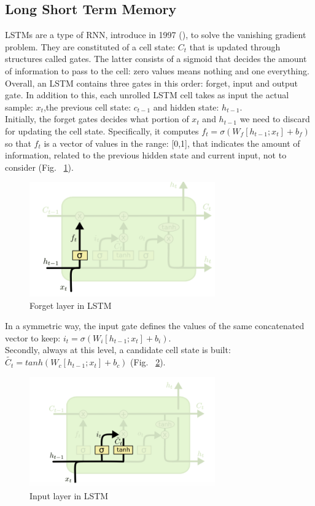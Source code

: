 \documentclass[LaM,binding=0.6cm]{sapthesis}
\begin{document}
\subsection{Long Short Term Memory}
LSTMs are a type of RNN, introduce in 1997 (\cite{lstmop}), to solve the vanishing gradient problem. They are constituted of a cell state: $C_t$ that is updated through structures called gates. The latter consists of a sigmoid that decides the amount of information to pass to the cell: zero values means nothing and one everything. Overall, an LSTM contains three gates in this order: forget, input and output gate. In addition to this, each unrolled LSTM cell takes as input the actual sample: $x_t$,the previous cell state: $c_{t-1}$ and hidden state: $h_{t-1}$.\\Initially, the forget gates decides what portion of $x_t$ and $h_{t-1}$ we need to discard for updating the cell state. Specifically, it computes $f_t=\sigma(W_f[h_{t-1};x_t]+b_f)$ so that $f_t$ is a vector of values in the range: [0,1], that indicates the amount of information, related to the  previous hidden state and current input, not to consider (Fig. ~\ref{fig:lstms1}).
\begin{figure}[H]  \centering
	\includegraphics[width=80mm,scale=0.7]{lstms1}
	\caption{Forget layer in LSTM \cite{lstmsite}}
	\label{fig:lstms1}
\end{figure}
In a symmetric way, the input gate defines the values of the same concatenated vector to keep: $i_t=\sigma(W_i[h_{t-1};x_t]+b_i)$.\\Secondly, always at this level, a candidate cell state is built: $\widetilde{C_t}=tanh(W_c[h_{t-1};x_t]+b_c)$ (Fig. ~\ref{fig:lstms2}).
\begin{figure}[H]  \centering
	\includegraphics[width=80mm,scale=0.7]{lstms2}
	\caption{Input layer in LSTM \cite{lstmsite}}
	\label{fig:lstms2}
\end{figure}
\end{document}
